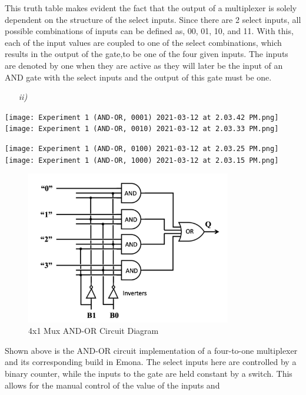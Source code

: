 \documentclass[12pt]{article}
\newcommand{\objects}[2]{%
  \leavevmode\vbox{\hbox{#1}\nointerlineskip\hbox{#2}}%
}
\begin{document}
\newpage
\par This truth table makes evident the fact that the output of a multiplexer is
solely dependent on the structure of the select inputs. Since there are 2 select
inputs, all possible combinations of inputs can be defined as, 00, 01, 10, and
11. With this, each of the input values are coupled to one of the select
combinations, which results in the output of the gate,to be one of the four
given inputs. The inputs are denoted by one when they are active as they will
later be the input of an AND gate with the select inputs and the output of this
gate must be one.
\begin{itemize}
    \item[\textit{ii)}]
\end{itemize}
\begin{center}
    \objects
        {\texttt{[image: Experiment 1 (AND-OR, 0001)
        2021-03-12 at 2.03.42 PM.png]}}
        {\texttt{[image: Experiment 1 (AND-OR, 0010)
        2021-03-12 at 2.03.33 PM.png]}}
    \objects
        {\texttt{[image: Experiment 1 (AND-OR, 0100)
        2021-03-12 at 2.03.25 PM.png]}}
        {\texttt{[image: Experiment 1 (AND-OR, 1000)
        2021-03-12 at 2.03.15 PM.png]}}
\end{center}
\begin{figure}[h]
    \centering
    \includegraphics[width=0.8\textwidth]{4x1 Mux AND-OR Circuit Diagram.png}
    \caption{4x1 Mux AND-OR Circuit Diagram}
\end{figure}
\par Shown above is the AND-OR circuit implementation of a four-to-one
multiplexer and its corresponding build in Emona. The select inputs here are
controlled by a binary counter, while the inputs to the gate are held constant
by a switch. This allows for the manual control of the value of the inputs and
\end{document}
